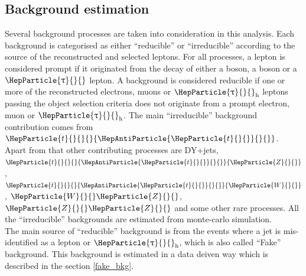 \documentclass[11.5pt, a4paper]{article}
\DeclareRobustCommand{\PW}{{\HepParticle{W}{}{}}\xspace}
\DeclareRobustCommand{\PZ}{{\HepParticle{Z}{}{}}\xspace}
\DeclareRobustCommand{\PQt}{\HepParticle{t}{}{}} %
\DeclareRobustCommand{\PAQt}{{\HepAntiParticle{\PQt}{}{}}\xspace} %
\DeclareRobustCommand{\PGt}{{\HepParticle{\uptau}{}{}}\xspace} %
\newcommand{\ttbar}{\PQt{}\PAQt} %
\newcommand{\tauh}{\ensuremath{\PGt_\mathrm{h}}\xspace}
\begin{document}
\subsection{Background estimation}
Several background processes are taken into consideration in this analysis. Each background is categorised as either “reducible” or “irreducible” according to the source of the reconstructed and selected leptons. For all processes, a lepton is considered prompt if it originated from the decay of either a \PW boson, a \PZ boson or a $\PGt$ lepton. A background is considered reducible if one or more of the reconstructed electrons, muons or $\tauh$ leptons passing the object selection criteria does not originate from a prompt electron, muon or $\tauh$. The main ``irreducible'' background contribution comes from $\ttbar$. Apart from that other contributing processes are DY+jets, $\ttbar\PZ$, $\ttbar\PW$, $\PW\PZ$, $\PZ\PZ$ and some other rare processes. All the ``irreducible'' backgrounds are estimated from monte-carlo simulation.\\
The main source of ``reducible'' background is from the events where a jet is mis-identified as a lepton or $\tauh$, which is also called ``Fake'' background. This background is estimated in a data deiven way which is described in the section \ref{fake_bkg}.
\end{document}
